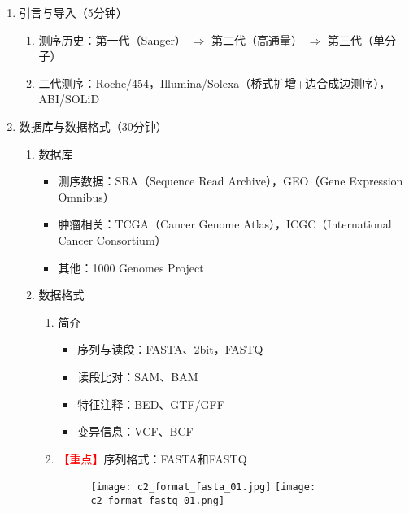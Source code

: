\documentclass{TIJMUjiaoanLL}
\begin{document}
\begin{enumerate}
  \item 引言与导入（5分钟）
    \begin{enumerate}
      \item 测序历史：第一代（Sanger） $\Rightarrow$ 第二代（高通量） $\Rightarrow$ 第三代（单分子）
      \item 二代测序：Roche/454，Illumina/Solexa（桥式扩增+边合成边测序），ABI/SOLiD
    \end{enumerate}

  \item 数据库与数据格式（30分钟）
    \begin{enumerate}
      \item 数据库
        \begin{itemize}
          \item 测序数据：SRA（Sequence Read Archive），GEO（Gene Expression Omnibus）
          \item 肿瘤相关：TCGA（Cancer Genome Atlas），ICGC（International Cancer Consortium）
          \item 其他：1000 Genomes Project
        \end{itemize}
      \item 数据格式
        \begin{enumerate}
          \item 简介
            \begin{itemize}
              \item 序列与读段：FASTA、2bit，FASTQ
              \item 读段比对：SAM、BAM
              \item 特征注释：BED、GTF/GFF
              \item 变异信息：VCF、BCF
            \end{itemize}
          \item \textcolor{red}{【重点】}序列格式：FASTA和FASTQ
            \vspace{-0.5em}
            \begin{figure}[h]
              \centering
              \texttt{[image: c2\_format\_fasta\_01.jpg]}
              \quad
              \texttt{[image: c2\_format\_fastq\_01.png]}
            \end{figure}
            \begin{itemize}
            \vspace{-0.5em}

\end{itemize}
\end{enumerate}
\end{enumerate}
\end{enumerate}
\end{document}

